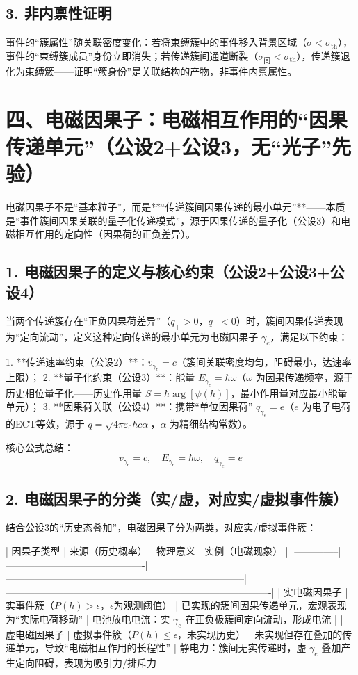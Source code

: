\documentclass{article}
\begin{document}
\subsection*{3. 非内禀性证明}
事件的“簇属性”随关联密度变化：若将束缚簇中的事件移入背景区域（$\sigma < \sigma_{\text{th}}$），事件的“束缚簇成员”身份立即消失；若传递簇间通道断裂（$\sigma_{\text{间}} < \sigma_{\text{th}}$），传递簇退化为束缚簇——证明“簇身份”是关联结构的产物，非事件内禀属性。


\section*{四、电磁因果子：电磁相互作用的“因果传递单元”（公设2+公设3，无“光子”先验）}
电磁因果子不是“基本粒子”，而是**“传递簇间因果传递的最小单元”**——本质是“事件簇间因果关联的量子化传递模式”，源于因果传递的量子化（公设3）和电磁相互作用的定向性（因果荷的正负差异）。

\subsection*{1. 电磁因果子的定义与核心约束（公设2+公设3+公设4）}
当两个传递簇存在“正负因果荷差异”（$q_+ > 0$，$q_- < 0$）时，簇间因果传递表现为“定向流动”，定义这种定向传递的最小单元为电磁因果子 $\gamma_e$，满足以下约束：

1. **传递速率约束（公设2）**：$v_{\gamma_e} = c$（簇间关联密度均匀，阻碍最小，达速率上限）；  
2. **量子化约束（公设3）**：能量 $E_{\gamma_e} = \hbar \omega$（$\omega$ 为因果传递频率，源于历史相位量子化——历史作用量 $S = \hbar \arg[\psi(h)]$，最小作用量对应最小能量单元）；  
3. **因果荷关联（公设4）**：携带“单位因果荷” $q_{\gamma_e} = e$（$e$ 为电子电荷的ECT等效，源于 $q = \sqrt{4\pi\varepsilon_0 \hbar c \alpha}$，$\alpha$ 为精细结构常数）。

核心公式总结：
\[
\boxed{v_{\gamma_e} = c,\quad E_{\gamma_e} = \hbar \omega,\quad q_{\gamma_e} = e}
\]

\subsection*{2. 电磁因果子的分类（实/虚，对应实/虚拟事件簇）}
结合公设3的“历史态叠加”，电磁因果子分为两类，对应实/虚拟事件簇：

| 因果子类型   | 来源（历史概率）                          | 物理意义                                                                 | 实例（电磁现象）                                                                 |
|--------------|-------------------------------------------|--------------------------------------------------------------------------|----------------------------------------------------------------------------------|
| 实电磁因果子 | 实事件簇（$P(h) > \epsilon$，$\epsilon$为观测阈值） | 已实现的簇间因果传递单元，宏观表现为“实际电荷移动”                         | 电池放电电流：实 $\gamma_e$ 在正负极簇间定向流动，形成电流                         |
| 虚电磁因果子 | 虚拟事件簇（$P(h) \leq \epsilon$，未实现历史）     | 未实现但存在叠加的传递单元，导致“电磁相互作用的长程性”                     | 静电力：簇间无实传递时，虚 $\gamma_e$ 叠加产生定向阻碍，表现为吸引力/排斥力         |
\end{document}
